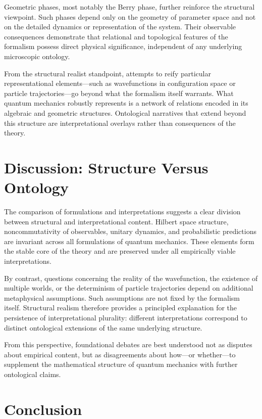 \documentclass[11pt]{article}
\begin{document}
Geometric phases, most notably the Berry phase, further reinforce the structural viewpoint. Such phases depend only on the geometry of parameter space and not on the detailed dynamics or representation of the system. Their observable consequences demonstrate that relational and topological features of the formalism possess direct physical significance, independent of any underlying microscopic ontology.

From the structural realist standpoint, attempts to reify particular representational elements—such as wavefunctions in configuration space or particle trajectories—go beyond what the formalism itself warrants. What quantum mechanics robustly represents is a network of relations encoded in its algebraic and geometric structures. Ontological narratives that extend beyond this structure are interpretational overlays rather than consequences of the theory.
\section{Discussion: Structure Versus Ontology}

The comparison of formulations and interpretations suggests a clear division between structural and interpretational content. Hilbert space structure, noncommutativity of observables, unitary dynamics, and probabilistic predictions are invariant across all formulations of quantum mechanics. These elements form the stable core of the theory and are preserved under all empirically viable interpretations.

By contrast, questions concerning the reality of the wavefunction, the existence of multiple worlds, or the determinism of particle trajectories depend on additional metaphysical assumptions. Such assumptions are not fixed by the formalism itself. Structural realism therefore provides a principled explanation for the persistence of interpretational plurality: different interpretations correspond to distinct ontological extensions of the same underlying structure.

From this perspective, foundational debates are best understood not as disputes about empirical content, but as disagreements about how—or whether—to supplement the mathematical structure of quantum mechanics with further ontological claims.

\section{Conclusion}
\end{document}
